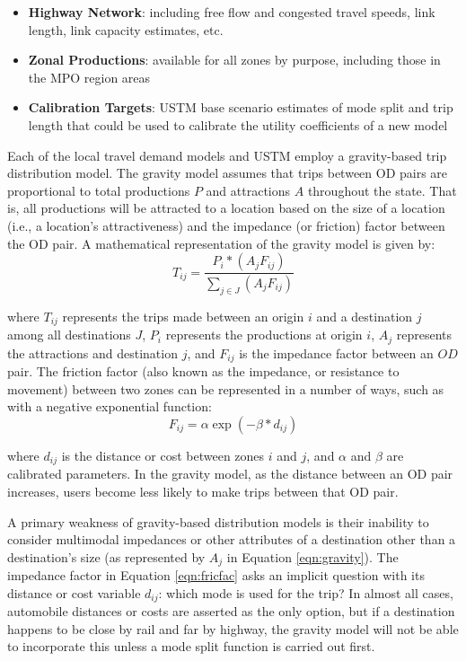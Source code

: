 \begin{itemize}
\item
  \textbf{Highway Network}: including free flow and congested travel speeds,
  link length, link capacity estimates, etc.
\item
  \textbf{Zonal Productions}: available for all zones by purpose,
  including those in the MPO region areas
\item
  \textbf{Calibration Targets}: USTM base scenario estimates of mode split and
  trip length that could be used to calibrate the utility coefficients of a new model
\end{itemize}

Each of the local travel demand models and USTM employ a gravity-based trip
distribution model. The gravity model assumes that trips between OD
pairs are proportional to total productions $P$ and
attractions $A$ throughout the state. That is, all productions will be
attracted to a location based on the size of a location (i.e., a location's
attractiveness) and the impedance (or friction) factor between the OD
pair. A mathematical representation of the gravity model is given by:
\begin{equation}
T_{ij}= \frac{P_i*(A_j F_{ij})}{\sum_{j\in J}(A_j F_{ij})}
 \label{eqn:gravity}
\end{equation}

\noindent where $T_{ij}$ represents the trips made between an origin $i$ and a
  destination $j$ among all destinations $J$, $P_i$ represents the productions at origin $i$, $A_j$ represents the attractions and destination $j$, and $F_{ij}$ is the impedance factor between an $OD$ pair.
The friction factor (also known as the impedance, or resistance to movement) between two
zones can be represented in a number of ways, such as with a negative
exponential function:
\begin{equation}
	F_{ij} = \alpha \exp(-\beta * d_{ij})
  \label{eqn:fricfac}
\end{equation}

\noindent where $d_{ij}$ is the distance or cost between zones $i$ and $j$, and $\alpha$
and $\beta$ are calibrated parameters. In the gravity model, as the distance
between an OD pair increases, users become less likely to make trips between
that OD pair.

A primary weakness of gravity-based distribution models is their inability to
consider multimodal impedances or other attributes of a destination other than
a destination's size (as represented by $A_j$ in Equation \ref{eqn:gravity}). The
impedance factor in Equation \ref{eqn:fricfac} asks an implicit question with its
distance or cost variable $d_{ij}$: which mode is used for the trip? In almost
all cases, automobile distances or costs are asserted as the only option, but if a
destination happens to be close by rail and far by highway, the gravity model
will not be able to incorporate this unless a mode split function is carried out first.

